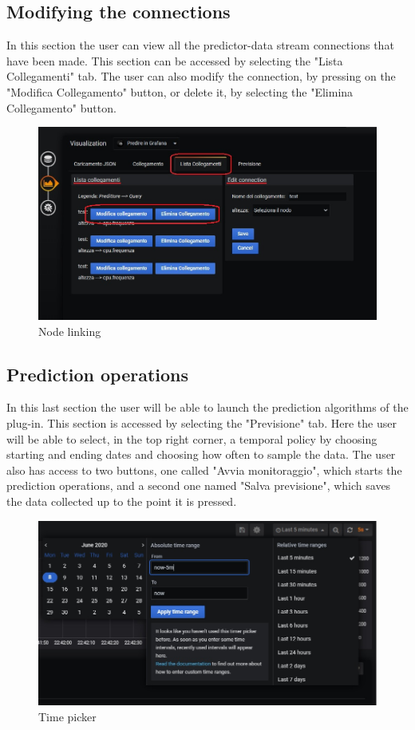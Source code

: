 \subsection{Modifying the connections}
In this section the user can view all the predictor-data stream connections that have been made. This section can be accessed by selecting the "Lista Collegamenti" tab.
The user can also modify the connection, by pressing on the "Modifica Collegamento" button, or delete it, by selecting the "Elimina Collegamento" button.

\begin{figure}[H]
\centering
\includegraphics[scale=0.75]{img/plug-in/collegamento_node.png}
\caption{Node linking}
\end{figure}


\subsection{Prediction operations}
In this last section the user will be able to launch the prediction algorithms of the plug-in. This section is accessed by selecting the "Previsione" tab. Here the user will be able to select, in the top right corner, a temporal policy by choosing starting and ending dates and choosing how often to sample the data. The user  also has access to two buttons, one called "Avvia monitoraggio", which starts the prediction operations, and a second one named "Salva previsione", which saves the data collected up to the point it is pressed.\\

\begin{figure}[H]
\centering
\includegraphics[scale=0.70]{img/plug-in/time_selector.png}
\caption{Time picker}
\end{figure}

